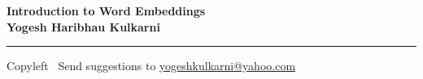 
\graphicspath{{images/}}

\footnotesize


\begin{center}
\Large{\textbf{Introduction to Word Embeddings\\ Yogesh Haribhau Kulkarni}}  
\end{center}

\begin{multicols}{2}
% 

\end{multicols}

\rule{\linewidth}{0.25pt}
\scriptsize
Copyleft \textcopyleft\  Send suggestions to 
\href{http://yati.io}{yogeshkulkarni@yahoo.com}


